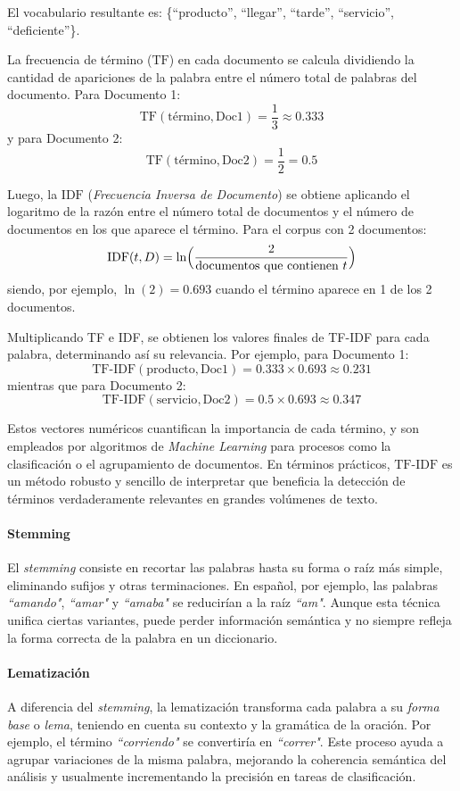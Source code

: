 \documentclass{matematicasud}
\begin{document}
El vocabulario resultante es: \{``producto'', ``llegar'', ``tarde'', ``servicio'', ``deficiente''\}. 

La frecuencia de término (\(\text{TF}\)) en cada documento se calcula dividiendo la cantidad de apariciones de la palabra entre el número total de palabras del documento. Para Documento 1:
\[
\text{TF}(\text{término}, \text{Doc1}) = \frac{1}{3} \approx 0.333
\]
y para Documento 2:
\[
\text{TF}(\text{término}, \text{Doc2}) = \frac{1}{2} = 0.5
\]

Luego, la \(\text{IDF}\) (\textit{Frecuencia Inversa de Documento}) se obtiene aplicando el logaritmo de la razón entre el número total de documentos y el número de documentos en los que aparece el término. Para el corpus con 2 documentos:
\[
\text{IDF}(t,D) = \ln \Bigl(\frac{2}{\text{documentos que contienen } t}\Bigr)
\]
siendo, por ejemplo, \(\ln(2)=0.693\) cuando el término aparece en 1 de los 2 documentos.

Multiplicando TF e IDF, se obtienen los valores finales de TF-IDF para cada palabra, determinando así su relevancia. Por ejemplo, para Documento 1:
\[
\text{TF-IDF}(\text{producto}, \text{Doc1}) = 0.333 \times 0.693 \approx 0.231
\]
mientras que para Documento 2:
\[
\text{TF-IDF}(\text{servicio}, \text{Doc2}) = 0.5 \times 0.693 \approx 0.347
\]

Estos vectores numéricos cuantifican la importancia de cada término, y son empleados por algoritmos de \textit{Machine Learning} para procesos como la clasificación o el agrupamiento de documentos. En términos prácticos, \(\text{TF-IDF}\) es un método robusto y sencillo de interpretar que beneficia la detección de términos verdaderamente relevantes en grandes volúmenes de texto.

\paragraph{Stemming} 
El \textit{stemming} consiste en recortar las palabras hasta su forma o raíz más simple, eliminando sufijos y otras terminaciones. En español, por ejemplo, las palabras \textit{``amando"}, \textit{``amar"} y \textit{``amaba"} se reducirían a la raíz \textit{``am"}. Aunque esta técnica unifica ciertas variantes, puede perder información semántica y no siempre refleja la forma correcta de la palabra en un diccionario.

\paragraph{Lematización}
A diferencia del \textit{stemming}, la lematización transforma cada palabra a su \textit{forma base} o \textit{lema}, teniendo en cuenta su contexto y la gramática de la oración. Por ejemplo, el término \textit{``corriendo"} se convertiría en \textit{``correr"}. Este proceso ayuda a agrupar variaciones de la misma palabra, mejorando la coherencia semántica del análisis y usualmente incrementando la precisión en tareas de clasificación.
\end{document}

